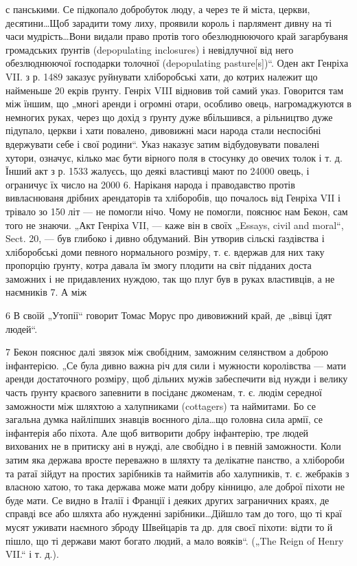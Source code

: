 с панськими. Се підкопало добробуток люду, а через те й міста, церкви, десятини\dots Щоб зарадити
тому лиху, проявили король і парлямент дивну на ті часи мудрість\dots Вони видали право протів того
обезлюднюючого край загарбуваня громадських ґрунтів (depopulating inclosures) і невідлучної
від него обезлюднюючої ґосподарки толочної (depopulating pasture[s])“. Оден акт Генріха VII. з р.
1489 заказує руйнувати хліборобські хати, до котрих належит що найменьше 20 екрів ґрунту. Генріх
VIII відновив той самий указ. Говорится там між їншим, що „многі аренди і огромні отари, особливо
овець, нагромаджуются в немногих руках, через що дохід
з ґрунту дуже вбільшився, а рільництво дуже підупало, церкви і хати повалено, дивовижні маси народа
стали неспосібні вдержувати себе і свої родини“. Указ наказує затим відбудовувати повалені хутори,
означує, кілько має бути вірного поля в стосунку до овечих толок і т. д. Їнший акт з р. 1533
жалуєсь, що деякі властивці мают по 24000 овець, і ограничує їх число на 2000 6. Наріканя народа і
праводавство протів вивласнюваня дрібних арендаторів та хліборобів, що почалось від Генріха VII і
трівало зо 150 літ
— не помогли нічо. Чому не помогли, пояснює нам Бекон, сам того не знаючи. „Акт Генріха VII, — каже
він в своїх „Essays, civil and moral“, Sect. 20, — був глибоко і дивно обдуманий. Він утворив
сільскі ґаздівства і хліборобські доми певного нормального розміру, т. є. вдержав для них таку
пропорцію ґрунту, котра давала їм змогу плодити на світ підданих доста заможних і не придавлених
нуждою, так що плуг був в руках властивців, а не наємників 7. А між

6 В своїй „Утопії“ говорит Томас Морус про дивовижний край, де
„вівці їдят людей“.

7 Бекон пояснює далі звязок між свобідним, заможним селянством
а доброю інфантерією. „Се була дивно важна річ для сили і мужности
королівства — мати аренди достаточного розміру, щоб дільних мужів
забеспечити від нужди і велику часть ґрунту краєвого запевнити в посіданє джоменам, т. є. людім
середної заможности між шляхтою а халупниками (cottagers) та наймитами. Бо се загальна думка
найліпших знавців воєнного діла\dots що головна сила армії, се інфантерія або піхота. Але щоб
витворити добру інфантерію, тре людей вихованих не в притиску ані в нужді, але свобідно і в певній
заможности. Коли затим яка держава вросте переважно в шляхту та делікатне панство, а хлібороби та
ратаї зійдут на простих зарібників та наймитів або халупників, т. є. жебраків з власною хатою, то
така держава може мати добру кінницю, але доброї піхоти не буде мати. Се видно в Італії і Франції і
деяких других заграничних краях, де справді все або шляхта або нужденні зарібники\dots Дійшло там до
того, що ті краї мусят уживати наємного зброду Швейцарів та др. для своєї піхоти: відти то й пішло,
що ті держави мают богато людий, а мало вояків“. („The Reign of   Henry VII.“ і т. д.).
